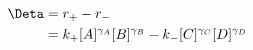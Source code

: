\begin{eqnarray}\label{eqn:flux-def}
\Deta & =r_+-r_- \\
&=  k_+[A]^{\gamma_A}[B]^{\gamma_B} -  k_-[C]^{\gamma_C}[D]^{\gamma_D} \\
\end{eqnarray}